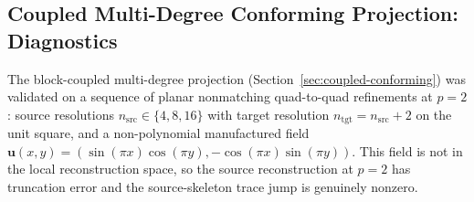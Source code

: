 \documentclass[11pt]{article}
\begin{document}
\begin{table}[t]
  \centering
  \small
  \caption{Planar Voronoi validation of the global target-edge
  \(H(\mathrm{div})\)-conforming projection.  The corrected field enforces exact
  target-cell divergence constraints while the raw transfer approaches the
  conforming field under refinement.}
  \label{tab:hdiv-projection}
\end{table}

\subsection{Coupled Multi-Degree Conforming Projection: Diagnostics}
\label{sec:results-coupled-conforming}

The block-coupled multi-degree projection
(Section~\ref{sec:coupled-conforming}) was validated on a sequence of planar
nonmatching quad-to-quad refinements at \(p=2\): source resolutions
\(n_{\mathrm{src}}\in\{4,8,16\}\) with target resolution
\(n_{\mathrm{tgt}}=n_{\mathrm{src}}+2\) on the unit square, and a non-polynomial
manufactured field
\(\mathbf{u}(x,y)=(\sin(\pi x)\cos(\pi y),-\cos(\pi x)\sin(\pi y))\).  This field
is not in the local reconstruction space, so the source reconstruction at
\(p=2\) has truncation error and the source-skeleton trace jump is genuinely
nonzero.
\end{document}
